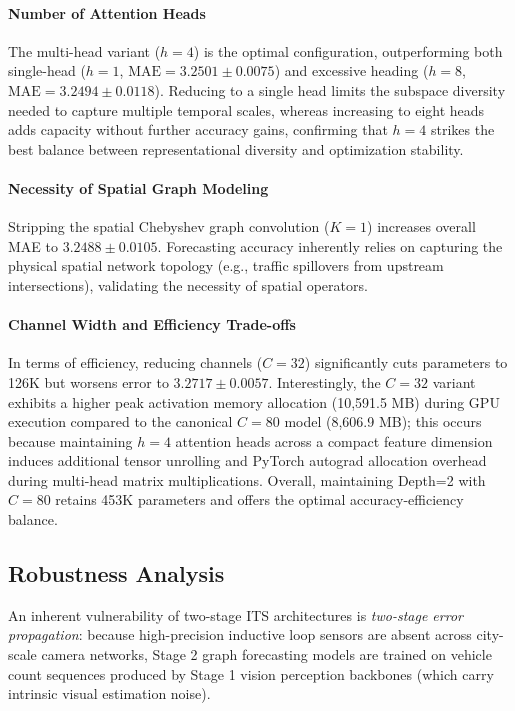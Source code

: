 \documentclass[a4paper,fleqn]{cas-sc}
\begin{document}
\paragraph{Number of Attention Heads} The multi-head variant ($h=4$) is the optimal configuration, outperforming both single-head ($h=1$, $\text{MAE} = 3.2501 \pm 0.0075$) and excessive heading ($h=8$, $\text{MAE} = 3.2494 \pm 0.0118$). Reducing to a single head limits the subspace diversity needed to capture multiple temporal scales, whereas increasing to eight heads adds capacity without further accuracy gains, confirming that $h=4$ strikes the best balance between representational diversity and optimization stability.

\paragraph{Necessity of Spatial Graph Modeling} Stripping the spatial Chebyshev graph convolution ($K=1$) increases overall MAE to $3.2488 \pm 0.0105$. Forecasting accuracy inherently relies on capturing the physical spatial network topology (e.g., traffic spillovers from upstream intersections), validating the necessity of spatial operators.

\paragraph{Channel Width and Efficiency Trade-offs} In terms of efficiency, reducing channels ($C=32$) significantly cuts parameters to 126K but worsens error to $3.2717 \pm 0.0057$. Interestingly, the $C=32$ variant exhibits a higher peak activation memory allocation (10,591.5 MB) during GPU execution compared to the canonical $C=80$ model (8,606.9 MB); this occurs because maintaining $h=4$ attention heads across a compact feature dimension induces additional tensor unrolling and PyTorch autograd allocation overhead during multi-head matrix multiplications. Overall, maintaining Depth=2 with $C=80$ retains 453K parameters and offers the optimal accuracy-efficiency balance.

\subsection{Robustness Analysis}
\label{sec:noise_robustness}

An inherent vulnerability of two-stage ITS architectures is \emph{two-stage error propagation}: because high-precision inductive loop sensors are absent across city-scale camera networks, Stage 2 graph forecasting models are trained on vehicle count sequences produced by Stage 1 vision perception backbones (which carry intrinsic visual estimation noise).
\end{document}
